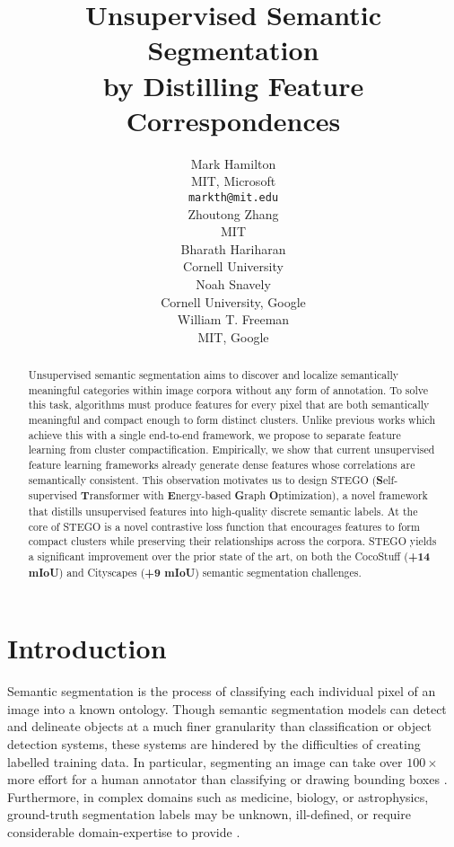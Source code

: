 \documentclass{article} \usepackage{iclr2022_conference,times}
\title{Unsupervised Semantic Segmentation \\ by Distilling Feature Correspondences}
\author{Mark Hamilton \\
MIT, Microsoft\\
\texttt{markth@mit.edu} \\
\And
Zhoutong Zhang \\
MIT \\
\And
Bharath Hariharan \\
Cornell University \\
\AND
Noah Snavely \\
Cornell University, Google \\
\And 
William T. Freeman \\
MIT, Google \\
}
\begin{document}
\maketitle
\vspace{-.2in}


\begin{abstract}
Unsupervised semantic segmentation aims to discover and localize semantically meaningful categories within image corpora without any form of annotation. To solve this task, algorithms must produce features for every pixel that are both semantically meaningful and compact enough to form distinct clusters. Unlike previous works which achieve this with a single end-to-end framework, we propose to separate feature learning from cluster compactification. Empirically, we show that current unsupervised feature learning frameworks already generate dense features whose correlations are semantically consistent. This observation motivates us to design STEGO (\textbf{S}elf-supervised \textbf{T}ransformer with \textbf{E}nergy-based \textbf{G}raph \textbf{O}ptimization), a novel framework that distills unsupervised features into high-quality discrete semantic labels. At the core of STEGO is a novel contrastive loss function that encourages features to form compact clusters while preserving their relationships across the corpora.
STEGO yields a significant improvement over the prior state of the art, on both the CocoStuff (\textbf{+14 mIoU}) and Cityscapes (\textbf{+9 mIoU}) semantic segmentation challenges.  



\end{abstract}


\section{Introduction}

Semantic segmentation is the process of classifying each individual pixel of an image into a known ontology. Though semantic segmentation models can detect and delineate objects at a much finer granularity than classification or object detection systems, these systems are hindered by the difficulties of creating labelled training data. In particular, segmenting an image can take over $100\times$ more effort for a human annotator than classifying or drawing bounding boxes \citep{zlateski2018importance}. Furthermore, in complex domains such as medicine, biology, or astrophysics, ground-truth segmentation labels may be unknown, ill-defined, or require considerable domain-expertise to provide \citep{yu2018methods}. 
\end{document}
